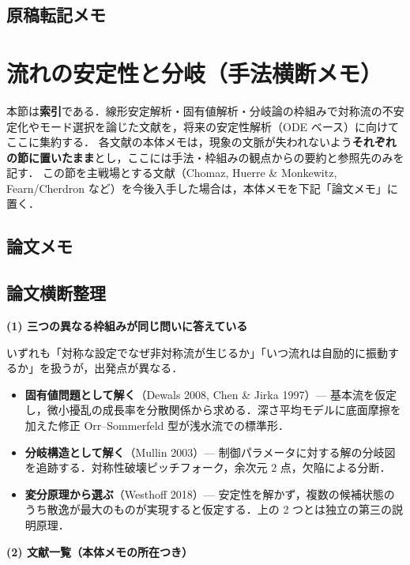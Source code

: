 \documentclass[11pt]{jsarticle}
\let\litsectionorig\section
\renewcommand{\section}{\clearpage\litsectionorig}
\begin{document}
\subsection*{原稿転記メモ}

\section{流れの安定性と分岐（手法横断メモ）}

\noindent 本節は\textbf{索引}である．線形安定解析・固有値解析・分岐論の枠組みで対称流の不安定化やモード選択を論じた文献を，将来の安定性解析（ODE ベース）に向けてここに集約する．
各文献の本体メモは，現象の文脈が失われないよう\textbf{それぞれの節に置いたまま}とし，ここには手法・枠組みの観点からの要約と参照先のみを記す．
この節を主戦場とする文献（Chomaz, Huerre \& Monkewitz, Fearn/Cherdron など）を今後入手した場合は，本体メモを下記「論文メモ」に置く．

\subsection*{論文メモ}

\subsection*{論文横断整理}

\noindent\textbf{(1) 三つの異なる枠組みが同じ問いに答えている}

いずれも「対称な設定でなぜ非対称流が生じるか」「いつ流れは自励的に振動するか」を扱うが，出発点が異なる．

\begin{itemize}
  \item \textbf{固有値問題として解く}（Dewals 2008, Chen \& Jirka 1997）— 基本流を仮定し，微小擾乱の成長率を分散関係から求める．深さ平均モデルに底面摩擦を加えた修正 Orr--Sommerfeld 型が浅水流での標準形．
  \item \textbf{分岐構造として解く}（Mullin 2003）— 制御パラメータに対する解の分岐図を追跡する．対称性破壊ピッチフォーク，余次元 2 点，欠陥による分断．
  \item \textbf{変分原理から選ぶ}（Westhoff 2018）— 安定性を解かず，複数の候補状態のうち散逸が最大のものが実現すると仮定する．上の 2 つとは独立の第三の説明原理．
\end{itemize}

\medskip
\noindent\textbf{(2) 文献一覧（本体メモの所在つき）}
\end{document}
